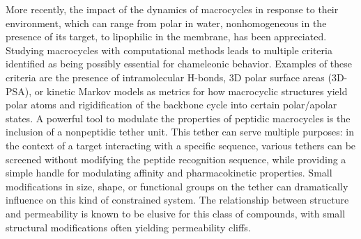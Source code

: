 More recently, the impact of the dynamics of macrocycles in response to their environment, which can range from polar in water, nonhomogeneous in the presence of its target, to lipophilic in the membrane, has been appreciated.\cite{Danelius2020, Witek2017, Riniker2019, Witek2019, Wang2021}
Studying macrocycles with computational methods leads to multiple criteria identified as being possibly essential for chameleonic behavior. Examples of these criteria are the presence of intramolecular H-bonds, 3D polar surface areas (3D-PSA), or kinetic Markov models as metrics for how macrocyclic structures yield polar atoms and rigidification of the backbone cycle into certain polar/apolar states. \cite{Witek2016, Witek2017, Tyagi2018, Witek2019, Wang2021}
A powerful tool to modulate the properties of peptidic macrocycles is the inclusion of a nonpeptidic tether unit.\cite{Marsault2007, Hoveyda2011, Roux2020} 
This tether can serve multiple purposes: in the context of a target interacting with a specific sequence, various tethers can be screened without modifying the peptide recognition sequence, while providing a simple handle for modulating affinity and pharmacokinetic properties. 
Small modifications in size, shape, or functional groups on the tether can dramatically influence on this kind of constrained system.\cite{Appavoo2019}
%
The relationship between structure and permeability is known to be elusive for this class of compounds, with small structural modifications often yielding permeability cliffs. \cite{Wang2014, Raeder2018, Beck2012, White2011, Roux2020, Bockus2015, Hewitt2015, Rezai2006, Over2016}


